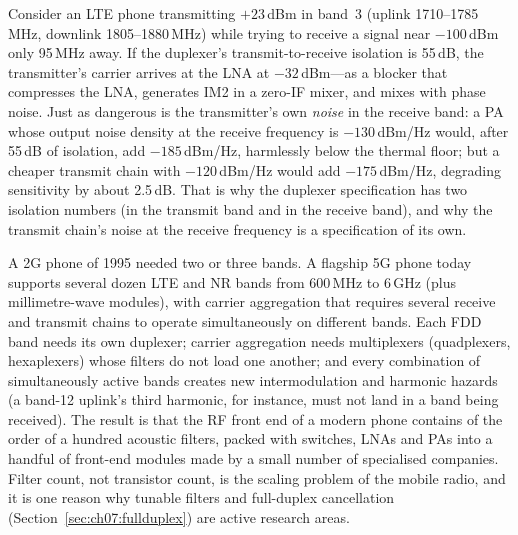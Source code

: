 
Consider an LTE phone transmitting $+23$\,dBm in band~3 (uplink 1710--1785\,MHz,
downlink 1805--1880\,MHz) while trying to receive a signal near $-100$\,dBm only 95\,MHz away. If the
duplexer's transmit-to-receive isolation is 55\,dB, the transmitter's carrier arrives at the LNA at
$-32$\,dBm---as a blocker that compresses the LNA, generates IM2 in a zero-IF mixer, and mixes with
phase noise. Just as dangerous is the transmitter's own \emph{noise} in the receive band: a PA whose
output noise density at the receive frequency is $-130$\,dBm/Hz would, after 55\,dB of isolation, add
$-185$\,dBm/Hz, harmlessly below the thermal floor; but a cheaper transmit chain with $-120$\,dBm/Hz would
add $-175$\,dBm/Hz, degrading sensitivity by about 2.5\,dB. That is why the duplexer specification has
two isolation numbers (in the transmit band and in the receive band), and why the transmit chain's noise
at the receive frequency is a specification of its own.

\begin{inpractice}
A 2G phone of 1995 needed two or three bands. A flagship 5G phone today supports several dozen LTE and
NR bands from 600\,MHz to 6\,GHz (plus millimetre-wave modules), with carrier aggregation that requires
several receive and transmit chains to operate simultaneously on different bands. Each FDD band needs
its own duplexer; carrier aggregation needs multiplexers (quadplexers, hexaplexers) whose filters do not
load one another; and every combination of simultaneously active bands creates new intermodulation and
harmonic hazards (a band-12 uplink's third harmonic, for instance, must not land in a band being
received). The result is that the RF front end of a modern phone contains of the order of a hundred
acoustic filters, packed with switches, LNAs and PAs into a handful of front-end modules made by a small
number of specialised companies. Filter count, not transistor count, is the scaling problem of the
mobile radio, and it is one reason why tunable filters and full-duplex cancellation
(Section~\ref{sec:ch07:fullduplex}) are active research areas.
\end{inpractice}

